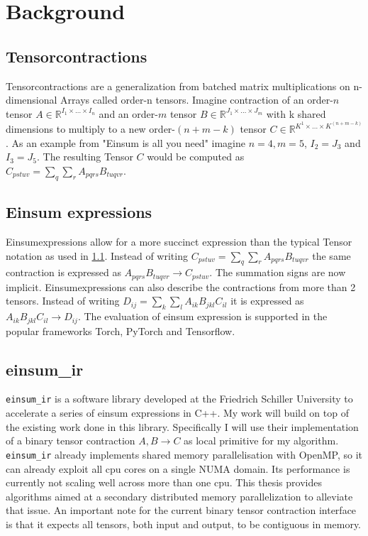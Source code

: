 \section{Background}

\subsection{Tensorcontractions}
\label{Tensorcontractions}

Tensorcontractions are a generalization from batched matrix multiplications on n-dimensional Arrays called order-n tensors.
Imagine contraction of an order-$n$ tensor $A \in \mathbb{R}^{I_1\times\dots\times I_n}$ and an order-$m$ tensor $B \in \mathbb{R}^{J_1\times\dots\times J_m}$ with k shared dimensions to multiply to a new order-$(n+m-k)$ tensor $C \in \mathbb{R}^{K^1\times\dots\times K^{(n+m-k)}}$.
As an example from "Einsum is all you need" \cite{einsum_is_all_you_need} imagine $n=4, m=5$, $I_2 = J_3$ and $I_3 = J_5$.
The resulting Tensor $C$ would be computed as $C_{pstuv}=\sum_{q}\sum_{r}A_{pqrs}B_{tuqvr}$.

\subsection{Einsum expressions}

Einsumexpressions allow for a more succinct expression than the typical Tensor notation as used in \ref{Tensorcontractions}.
Instead of writing $C_{pstuv}=\sum_{q}\sum_{r}A_{pqrs}B_{tuqvr}$ the same contraction is expressed as $A_{pqrs}B_{tuqvr} \rightarrow C_{pstuv}$.
The summation signs are now implicit.
Einsumexpressions can also describe the contractions from more than 2 tensors\cite{einsum_is_all_you_need}.
Instead of writing $D_{ij} = \sum_{k}\sum_{l}A_{ik}B_{jkl}C_{il}$ it is expressed as $A_{ik}B_{jkl}C_{il} \rightarrow D_{ij}$.
The evaluation of einsum expression is supported in the popular frameworks Torch\cite{torch}, PyTorch\cite{pytorch} and Tensorflow\cite{tensorflow}.

\subsection{einsum\_ir}

\texttt{einsum\_ir}\cite{einsum_ir} is a software library developed at the Friedrich Schiller University to accelerate a series of einsum expressions in C++.
My work will build on top of the existing work done in this library.
Specifically I will use their implementation of a binary tensor contraction $A,B \rightarrow C$ as local primitive for my algorithm.
\texttt{einsum\_ir} already implements shared memory parallelisation with OpenMP\cite{openMP}, so it can already exploit all cpu cores on a single NUMA domain.
Its performance is currently not scaling well across more than one cpu. %
This thesis provides algorithms aimed at a secondary distributed memory parallelization to alleviate that issue.
An important note for the current binary tensor contraction interface is that it expects all tensors, both input and output, to be contiguous in memory.

